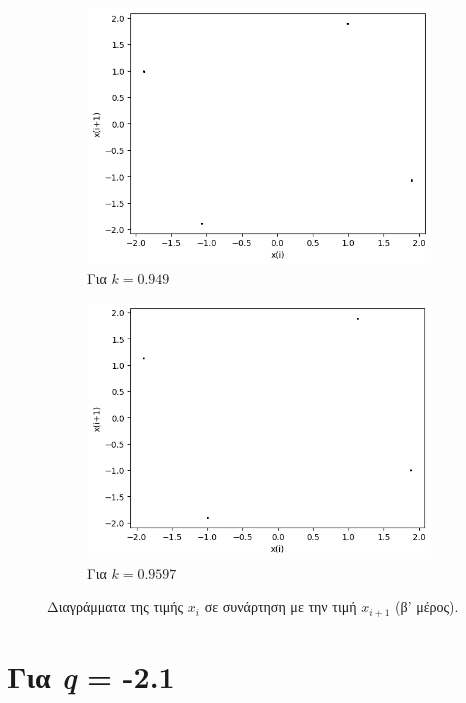 \begin{figure}[ht]
\begin{subfigure}[b]{0.4\textwidth}
		\includegraphics[width=\textwidth]{LateX images/graphs q19/g13}
		\caption{Για $k=0.949$}
		\label{f:k102}
	\end{subfigure}
	\hfill
	\begin{subfigure}[b]{0.4\textwidth}
		\centering
		\includegraphics[width=\textwidth]{LateX images/graphs q19/g14}
		\caption{Για $k=0.9597$}
		\label{f:k103}
	\end{subfigure}
	\hfill
	\caption{Διαγράμματα της τιμής \(x_i\) σε συνάρτηση με την τιμή \(x_{i+1}\) (β' μέρος).}
	\label{f:k243}
\end{figure}

\clearpage

\section{Για \emph{q} = -2.1}

